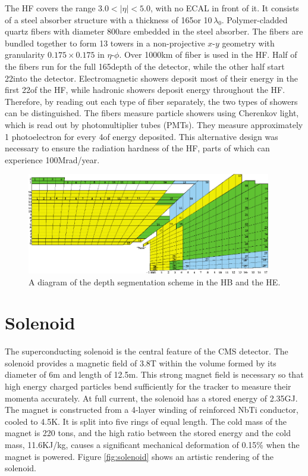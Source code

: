 \documentclass[12pt]{thesis}  %
\begin{document}
The HF covers the range $3.0<|\eta|<5.0$, with no ECAL in front of it. It consists of a steel absorber structure with a thickness of 165\cm or 10$\,\lambda_{0}$. Polymer-cladded quartz fibers with diameter 800\mum are embedded in the steel absorber. The fibers are bundled together to form 13 towers in a non-projective $x$-$y$ geometry with granularity $0.175\times0.175$ in $\eta$-$\phi$. Over 1000\unit{km} of fiber is used in the HF. Half of the fibers run for the full 165\cm depth of the detector, while the other half start 22\cm into the detector. Electromagnetic showers deposit most of their energy in the first 22\cm of the HF, while hadronic showers deposit energy throughout the HF. Therefore, by reading out each type of fiber separately, the two types of showers can be distinguished. The fibers measure particle showers using Cherenkov light, which is read out by photomultiplier tubes (PMTs). They measure approximately 1 photoelectron for every 4\GeV of energy deposited. This alternative design was necessary to ensure the radiation hardness of the HF, parts of which can experience 100\unit{Mrad/year}.

\begin{figure}[hbt]
\begin{center}
\includegraphics[width=0.95\textwidth]{figures/HCAL_tower_segmentation.pdf}
\caption{A diagram of the depth segmentation scheme in the HB and the HE.}
\label{fig:hcal-depths}
\end{center}
\end{figure}


\section{Solenoid}

The superconducting solenoid is the central feature of the CMS detector. The solenoid provides a magnetic field of 3.8\unit{T} within the volume formed by its diameter of 6\unit{m} and length of 12.5\unit{m}. This strong magnet field is necessary so that high energy charged particles bend sufficiently for the tracker to measure their momenta accurately. At full current, the solenoid has a stored energy of 2.35\unit{GJ}. The magnet is constructed from a 4-layer winding of reinforced NbTi conductor, cooled to 4.5\unit{K}. It is split into five rings of equal length. The cold mass of the magnet is 220 tons, and the high ratio between the stored energy and the cold mass, 11.6\unit{KJ/kg}, causes a significant mechanical deformation of 0.15\% when the magnet is powered. Figure \ref{fig:solenoid} shows an artistic rendering of the solenoid.
\end{document}
